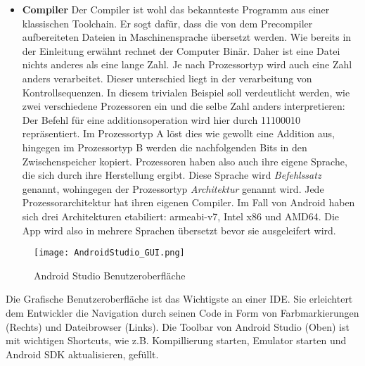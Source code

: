 \begin{itemize}
\item \textbf{Compiler} Der Compiler ist wohl das bekannteste Programm aus einer klassischen Toolchain. Er sogt dafür, dass die von dem Precompiler aufbereiteten Dateien in Maschinensprache übersetzt werden.
Wie bereits in der Einleitung erwähnt rechnet der Computer Binär. Daher ist eine Datei nichts anderes als eine lange Zahl. Je nach Prozessortyp wird auch eine Zahl anders verarbeitet. Dieser unterschied liegt in der verarbeitung von Kontrollsequenzen. In diesem trivialen Beispiel soll verdeutlicht werden, wie zwei verschiedene Prozessoren ein und die selbe Zahl anders interpretieren: Der Befehl für eine additionsoperation wird hier durch 11100010 repräsentiert. Im Prozessortyp A löst dies wie gewollt eine Addition aus, hingegen im Prozessortyp B werden die nachfolgenden Bits in den Zwischenspeicher kopiert. Prozessoren haben also auch ihre eigene Sprache, die sich durch ihre Herstellung ergibt. Diese Sprache wird \textit{Befehlssatz} genannt, wohingegen der Prozessortyp \textit{Architektur} genannt wird. Jede Prozessorarchitektur hat ihren eigenen Compiler.
Im Fall von Android haben sich drei Architekturen etabiliert: armeabi-v7, Intel x86 und AMD64. Die App wird also in mehrere Sprachen übersetzt bevor sie ausgeleifert wird.
\end{itemize}

\newpage

\begin{figure}[htbp] 
  \centering
     \texttt{[image: AndroidStudio\_GUI.png]}
  \caption{Android Studio Benutzeroberfläche \cite{ASGUI}}
  \label{fig:Android Studio GUI}
\end{figure}
Die Grafische Benutzeroberfläche ist das Wichtigste an einer IDE. Sie erleichtert dem Entwickler die Navigation durch seinen Code in Form von Farbmarkierungen (Rechts) und Dateibrowser (Links).
Die Toolbar von Android Studio (Oben) ist mit wichtigen Shortcuts, wie z.B. Kompillierung starten, Emulator starten und Android SDK aktualisieren, gefüllt.